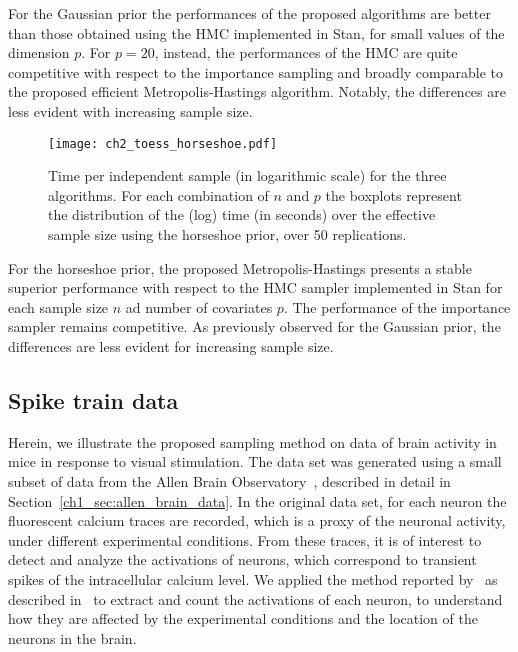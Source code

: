 For the Gaussian prior the performances of the proposed algorithms are better than those obtained using the HMC implemented in Stan, for small values of the dimension $p$. For $p=20$, instead, the performances of the HMC are quite competitive with respect to the importance sampling and broadly comparable to the proposed efficient Metropolis-Hastings algorithm. Notably, the differences are less evident with increasing sample size. 

\begin{figure}[h!]
	\begin{center}
		\texttt{[image: ch2\_toess\_horseshoe.pdf]}
		\caption[Comparison between the time per independent sample of the proposed algorithms and of the HMC algorithm, using a horseshoe prior.]{Time per independent sample (in logarithmic scale) for the three algorithms. For each combination of $n$ and $p$ the boxplots represent the distribution of the (log) time (in seconds) over the effective sample size using the horseshoe prior, over 50 replications.
			\label{fig:time_ess_horseshoe}}
	\end{center}
\end{figure}
%
For the horseshoe prior, the proposed Metropolis-Hastings presents a stable superior performance with respect to the HMC sampler implemented in Stan for each sample size $n$ ad number of covariates $p$. The performance of the importance sampler remains competitive. As previously observed for the Gaussian prior, the differences are less evident for increasing sample size. 





\subsection{Spike train data}
\label{ch2_sec:application}
%
Herein, we illustrate the proposed sampling method on data of brain activity in mice in response to visual stimulation.
The data set was generated using a small subset of data from the Allen Brain Observatory~\parencite{allen}, described in detail in Section~\ref{ch1_sec:allen_brain_data}.
In the original data set, for each neuron the fluorescent calcium traces are recorded, which is a proxy of the neuronal activity, under different experimental conditions. From these traces, it is of interest to detect and analyze the activations of neurons, which correspond to transient spikes of the intracellular calcium level. 
We applied the method reported by~\textcite{jewell2019} as described in~\textcite{vries2020} to extract and count the activations of each neuron, to understand how they are affected by the experimental conditions and the location of the neurons in the brain. 

